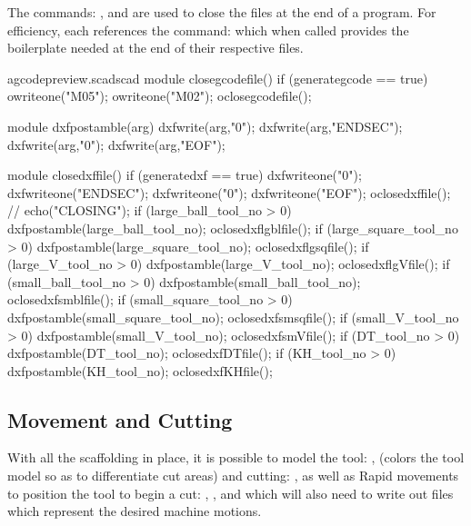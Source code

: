 \documentclass{ltxdoc}
\begin{document}
The commands: 
, and
are used to close the files at the end of a program. For efficiency, each references the command:
which when called provides the boilerplate needed at the end of their respective files.

\lstset{firstnumber=\thegcpscad}
\begin{writecode}{a}{gcodepreview.scad}{scad}
module closegcodefile() {
  if (generategcode == true) {
    owriteone("M05");
    owriteone("M02");
    oclosegcodefile();
  }
}

module dxfpostamble(arg) {
    dxfwrite(arg,"0");
    dxfwrite(arg,"ENDSEC");
    dxfwrite(arg,"0");
    dxfwrite(arg,"EOF");
}

module closedxffile() {
  if (generatedxf == true) {
    dxfwriteone("0");
    dxfwriteone("ENDSEC");
    dxfwriteone("0");
    dxfwriteone("EOF");
    oclosedxffile();
//    echo("CLOSING");
    if (large_ball_tool_no >  0) {    dxfpostamble(large_ball_tool_no);
      oclosedxflgblfile();
    } 
    if (large_square_tool_no >  0) {    dxfpostamble(large_square_tool_no);
      oclosedxflgsqfile();
    } 
    if (large_V_tool_no >  0) {    dxfpostamble(large_V_tool_no);
      oclosedxflgVfile();
    } 
    if (small_ball_tool_no >  0) {    dxfpostamble(small_ball_tool_no);
      oclosedxfsmblfile();
    } 
    if (small_square_tool_no >  0) {    dxfpostamble(small_square_tool_no);
      oclosedxfsmsqfile();
    } 
    if (small_V_tool_no >  0) {    dxfpostamble(small_V_tool_no);
      oclosedxfsmVfile();
    } 
    if (DT_tool_no >  0) {    dxfpostamble(DT_tool_no);
      oclosedxfDTfile();
    } 
    if (KH_tool_no >  0) {    dxfpostamble(KH_tool_no);
      oclosedxfKHfile();
    } 
  }
}

\end{writecode}
\addtocounter{gcpscad}{50}

%
 
\subsection{Movement and Cutting}

With all the scaffolding in place, it is possible to model the tool: 
, (colors the tool model so as to differentiate cut areas)
and cutting: 
, 
as well as Rapid movements to position the tool to begin a cut:
, , and 
which will also need to write out files which represent the desired machine motions.
 
\end{document}
